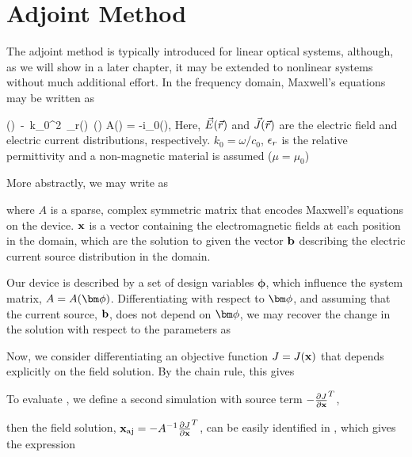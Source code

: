 \section{Adjoint Method}

The adjoint method is typically introduced for linear optical systems, although, as we will show in a later chapter, it may be extended to nonlinear systems without much additional effort.
In the frequency domain, Maxwell's equations may be written as

{\dcurl \vE (\vr)\ -\ k_0^2\ \eps_r(\vr)\ \vE(\vr) \equiv A\vE(\vr) = -i\mu_0\omega\vJ(\vr),}
%
Here, $\vec{E}(\vec{r})$ and $\vec{J}(\vec{r})$ are the electric field and electric current distributions, respectively. $k_0 = \omega/c_0$, $\epsilon_r$ is the relative permittivity and a non-magnetic material is assumed ($\mu = \mu_0$)

More abstractly, we may write  as
%

%
where $A$ is a sparse, complex symmetric matrix that encodes Maxwell's equations on the device.  
$\mathbf{x}$ is a vector containing the electromagnetic fields at each position in the domain, which are the solution to  given the vector $\mathbf{b}$ describing the electric current source distribution in the domain.

Our device is described by a set of design variables $\bm{\phi}$, which influence the system matrix, $A = A(\bfphi)$.
Differentiating  with respect to $\bfphi$, and assuming that the current source, $\mathbf{b}$, does not depend on $\bfphi$, we may recover the change in the solution with respect to the parameters as
%

%
Now, we consider differentiating an objective function $J = J(\mathbf{x})$ that depends explicitly on the field solution.
By the chain rule, this gives



To evaluate , we define a second simulation with source term $-\frac{\partial J}{\partial \mathbf{x}}^T$,


then the field solution, $\mathbf{x}_{\textrm{aj}} = -A^{-1}\frac{\partial J}{\partial \mathbf{x}}^T$, can be easily identified in , which gives the expression

